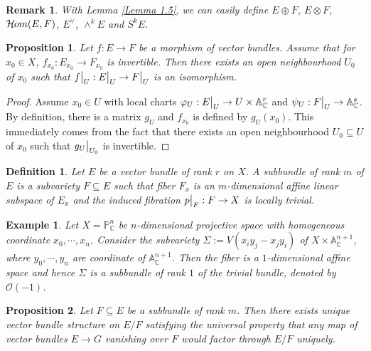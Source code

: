 \documentclass{ctexart}
\newtheorem{definition}{Definition}[section]
\newtheorem{remark}{Remark}[section]
\newtheorem{proposition}{Proposition}[section]
\newtheorem{example}{Example}[section]
\newcommand{\sheafhom}{\mathcal{H}\kern -.5pt om}
\begin{document}
\begin{remark}
    With Lemma \ref{Lemma 1.5}, we can easily define $E \oplus F$, $E \otimes F$, $\sheafhom(E, F)$, $E^{\vee}$, $\wedge^{k} E$ and $S^{k} E$.
\end{remark}
\begin{proposition}
    Let $f: E \rightarrow F$ be a morphism of vector bundles.
    Assume that for $x_{0}\in X$, $f_{x_{0}}: E_{x_{0}} \rightarrow F_{x_{0}}$ is invertible.
    Then there exists an open neighbourhood $U_{0}$ of $x_{0}$ such that $f\big{|}_{U}: E\big{|}_{U} \rightarrow F\big{|}_{U}$ is an isomorphism.
    \label{Proposition 1.11}
\end{proposition}
\begin{proof}
    Assume $x_{0}\in U$ with local charts $\varphi_{U}: E\big{|}_{U} \rightarrow U \times \mathbb{A}_{\mathbb{C}}^{r}$ and $\psi_{U}: F\big{|}_{U} \rightarrow \mathbb{A}_{\mathbb{C}}^{s}$.
    By definition, there is a matrix $g_{U}$ and $f_{x_{0}}$ is defined by $g_{U}(x_{0})$.
    This immediately comes from the fact that there exists an open neighbourhood $U_{0} \subseteq U$ of $x_{0}$ such that $g_{U}\big{|}_{U_{0}}$ is invertible.
\end{proof}
\begin{definition}
    Let $E$ be a vector bundle of rank $r$ on $X$.
    A subbundle of rank $m$ of $E$ is a subvariety $F \subseteq E$ such that fiber $F_{x}$ is an $m$-dimensional affine linear subspace of $E_{x}$ and the induced fibration $p\big{|}_{F}: F \rightarrow X$ is locally trivial.
\end{definition}
\begin{example}
    Let $X = \mathbb{P}_{\mathbb{C}}^{n}$ be $n$-dimensional projective space with homogeneous coordinate $x_{0}, \cdots, x_{n}$.
    Consider the subvariety $\Sigma := V(x_{i}y_{j} - x_{j}y_{i})$ of $X \times \mathbb{A}_{\mathbb{C}}^{n + 1}$,
    where $y_{0}, \cdots, y_{n}$ are coordinate of $\mathbb{A}_{\mathbb{C}}^{n + 1}$.
    Then the fiber is a $1$-dimensional affine space and hence $\Sigma$ is a subbundle of rank $1$ of the trivial bundle, denoted by $\mathcal{O}(-1)$.
\end{example}
\begin{proposition}
    Let $F \subseteq E$ be a subbundle of rank $m$.
    Then there exists unique vector bundle structure on $E/F$ satisfying the universal property that any map of vector bundles $E \rightarrow G$ vanishing over $F$ would factor through $E/F$ uniquely.
    \label{Proposition 1.12}
\end{proposition}
\end{document}
